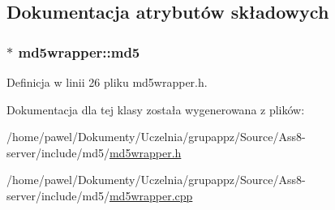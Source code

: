 \subsection{Dokumentacja atrybutów składowych}
\hypertarget{a00004_fe675f7d8993ec64ddefa902dff431fa}{
\subsubsection[{md5}]{$\ast$ {\bf md5wrapper::md5}}}
\label{d0/d0b/a00004_fe675f7d8993ec64ddefa902dff431fa}




Definicja w linii 26 pliku md5wrapper.h.

Dokumentacja dla tej klasy została wygenerowana z plików:\begin{CompactItemize}
\item 
/home/pawel/Dokumenty/Uczelnia/grupappz/Source/Ass8-server/include/md5/\hyperlink{a00012}{md5wrapper.h}\item 
/home/pawel/Dokumenty/Uczelnia/grupappz/Source/Ass8-server/include/md5/\hyperlink{a00011}{md5wrapper.cpp}\end{CompactItemize}
